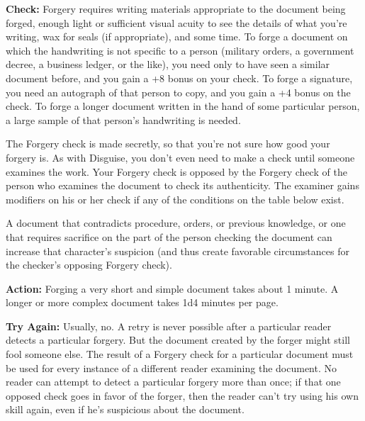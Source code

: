 \textbf{Check:} Forgery requires writing materials appropriate to the document being forged, enough light or sufficient visual acuity to see the details of what you're writing, wax for seals (if appropriate), and some time. To forge a document on which the handwriting is not specific to a person (military orders, a government decree, a business ledger, or the like), you need only to have seen a similar document before, and you gain a +8 bonus on your check. To forge a signature, you need an autograph of that person to copy, and you gain a +4 bonus on the check. To forge a longer document written in the hand of some particular person, a large sample of that person's handwriting is needed.

The Forgery check is made secretly, so that you're not sure how good your forgery is. As with Disguise, you don't even need to make a check until someone examines the work. Your Forgery check is opposed by the Forgery check of the person who examines the document to check its authenticity. The examiner gains modifiers on his or her check if any of the conditions on the table below exist.


A document that contradicts procedure, orders, or previous knowledge, or one that requires sacrifice on the part of the person checking the document can increase that character's suspicion (and thus create favorable circumstances for the checker's opposing Forgery check).

\textbf{Action:} Forging a very short and simple document takes about 1 minute. A longer or more complex document takes 1d4 minutes per page.

\textbf{Try Again:} Usually, no. A retry is never possible after a particular reader detects a particular forgery. But the document created by the forger might still fool someone else. The result of a Forgery check for a particular document must be used for every instance of a different reader examining the document. No reader can attempt to detect a particular forgery more than once; if that one opposed check goes in favor of the forger, then the reader can't try using his own skill again, even if he's suspicious about the document.

